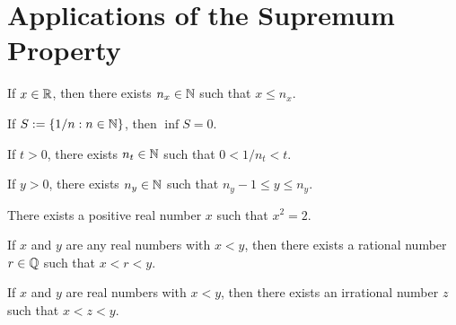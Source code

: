 \section{Applications of the Supremum Property}

\begin{theorem}
	If $x \in \mathbb{R}$, then there exists $n_x \in \mathbb{N}$ such that $x \leq n_x$.
\end{theorem}

\begin{corollary}
	If $S:= \{1/n : n \in \mathbb{N}\}$, then $\inf S = 0$.
\end{corollary}

\begin{corollary}
	If $t >0$, there exists $n_t \in \mathbb{N}$ such that $0 < 1/n_t < t$.
\end{corollary}

\begin{corollary}
	If $y>0$, there exists $n_y \in \mathbb{N}$ such that $n_y -1 \leq y \leq n_y$.
\end{corollary}

\begin{theorem}
	There exists a positive real number $x$ such that $x^2 = 2$.
\end{theorem}

\begin{theorem}
	If $x$ and $y$ are any real numbers with $x<y$, then there exists a rational number $r \in \mathbb{Q}$ such that $x < r < y$.
\end{theorem}

\begin{corollary}
	If $x$ and $y$ are real numbers with $x < y$, then there exists an irrational number $z$ such that $x < z < y$.
\end{corollary}

